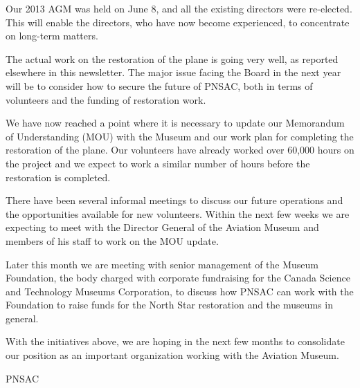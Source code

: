 Our 2013 AGM was held on June 8, and all the existing directors were
re-elected.  This will enable the directors, who have now become
experienced, to concentrate on long-term matters.

The actual work on the restoration of the plane is going very well, as
reported elsewhere in this newsletter. The major issue facing the
Board in the next year will be to consider how to secure the future of
PNSAC, both in terms of volunteers and the funding of restoration
work.

We have now reached a point where it is necessary to update our
Memorandum of Understanding (MOU) with the Museum and our work plan
for completing the restoration of the plane.  Our volunteers have
already worked over 60,000 hours on the project and we expect to work
a similar number of hours before the restoration is completed.

There have been several informal meetings to discuss our future
operations and the opportunities available for new volunteers.  Within
the next few weeks we are expecting to meet with the Director General
of the Aviation Museum and members of his staff to work on the MOU
update.

Later this month we are meeting with senior management of the Museum
Foundation, the body charged with corporate fundraising for the Canada
Science and Technology Museums Corporation, to discuss how PNSAC can
work with the Foundation to raise funds for the North Star restoration
and the museums in general.

With the initiatives above, we are hoping in the next few months to
consolidate our position as an important organization working with the
Aviation Museum.


\begin{footnotesize}
    \raggedleft PNSAC\\
\end{footnotesize}



